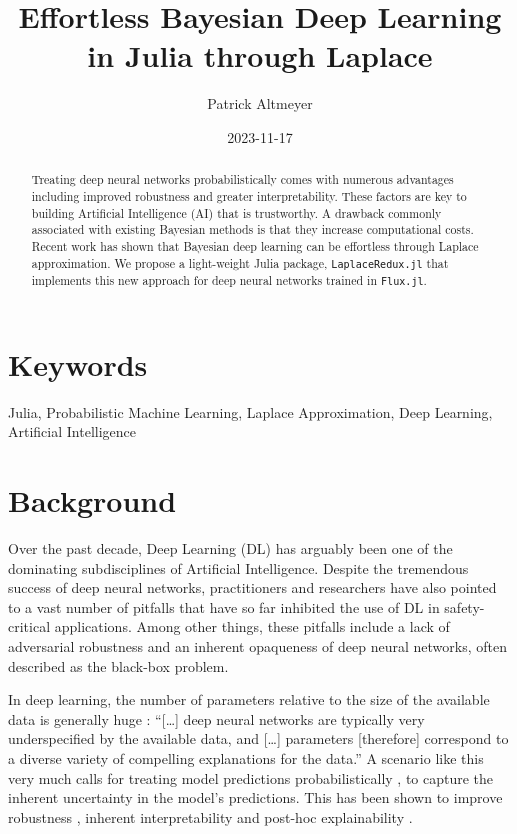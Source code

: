 \documentclass{juliacon}
\title{Effortless Bayesian Deep Learning in Julia through Laplace}
\author[1]{Patrick Altmeyer}
\affil[1]{Delft University of Technology}
\date{2023-11-17}
\providecommand{\JCONkeywords}[1]
{
  \small	
  \section*{Keywords} #1
}
\begin{document}
\maketitle

\begin{abstract}

Treating deep neural networks probabilistically comes with numerous
advantages including improved robustness and greater interpretability.
These factors are key to building Artificial Intelligence (AI) that is
trustworthy. A drawback commonly associated with existing Bayesian
methods is that they increase computational costs. Recent work has shown
that Bayesian deep learning can be effortless through Laplace
approximation. We propose a light-weight Julia package,
\texttt{LaplaceRedux.jl} that implements this new approach for deep
neural networks trained in \texttt{Flux.jl}.
\end{abstract}

\JCONkeywords{Julia, Probabilistic Machine Learning, Laplace
Approximation, Deep Learning, Artificial Intelligence}


\setcounter{page}{1}


\section{Background}\label{sec-intro}

Over the past decade, Deep Learning (DL) has arguably been one of the
dominating subdisciplines of Artificial Intelligence. Despite the
tremendous success of deep neural networks, practitioners and
researchers have also pointed to a vast number of pitfalls that have so
far inhibited the use of DL in safety-critical applications. Among other
things, these pitfalls include a lack of adversarial robustness
\cite{goodfellow2014explaining} and an inherent opaqueness of deep
neural networks, often described as the black-box problem.

In deep learning, the number of parameters relative to the size of the
available data is generally huge \cite{wilson2020case}: ``{[}\ldots{]}
deep neural networks are typically very underspecified by the available
data, and {[}\ldots{]} parameters {[}therefore{]} correspond to a
diverse variety of compelling explanations for the data.'' A scenario
like this very much calls for treating model predictions
probabilistically \cite{wilson2020case}, to capture the inherent
uncertainty in the model's predictions. This has been shown to improve
robustness \cite{daxberger2021laplace}, inherent interpretability
\cite{ish-horowicz2019interpreting} and post-hoc explainability
\cite{schut2021generating,altmeyer2023faithful}.
\end{document}
